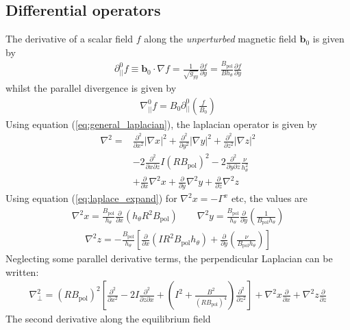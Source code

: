 \documentclass[12pt]{article}
\newcommand{\deriv}[2]{\ensuremath{\frac{\partial #1}{\partial #2}}}
\newcommand{\dderiv}[2]{\ensuremath{\frac{\partial^2 #1}{\partial {#2}^2}}}
\newcommand{\hthe}{\ensuremath{h_\theta}}
\newcommand{\Bp}{\ensuremath{B_{\text{pol}}}}
\newcommand{\ve}[1]{\ensuremath{\boldsymbol{#1}}}
\newcommand{\delp}{\nabla_\perp^2}
\newcommand{\rbp}{\ensuremath{R\Bp}}
\newcommand{\rbpsq}{\ensuremath{\left(\rbp\right)^2}}
\begin{document}
\subsection{Differential operators}
%
The derivative of a scalar field $f$ along the \emph{unperturbed} magnetic
field $\ve{b}_0$ is given by
%
\begin{align*}
\partial^0_{||}f \equiv \ve{b}_0 \cdot\nabla f =
\frac{1}{\sqrt{g_{yy}}}\deriv{f}{y} = \frac{\Bp}{B\hthe}\deriv{f}{y}
\end{align*}
%
whilst the parallel divergence is given by
%
\begin{align*}
\nabla^0_{||}f = B_0\partial^0_{||}\left(\frac{f}{B_0}\right)
\end{align*}
%
Using equation (\ref{eq:general_laplacian}), the laplacian operator is given by
%
\begin{align*}
\nabla^2 = &\frac{\partial^2}{\partial x^2}\left|\nabla x\right|^2 +
    \frac{\partial^2}{\partial y^2}\left|\nabla y\right|^2 +
    \frac{\partial^2}{\partial z^2}\left|\nabla z\right|^2 \nonumber \\
    &-2\frac{\partial^2}{\partial x\partial z}I\left(R\Bp\right)^2 -
    2\frac{\partial^2}{\partial y\partial z}\frac{\nu}{h_\theta^2}\\
    &+\frac{\partial}{\partial x}\nabla^2x + \frac{\partial}{\partial
y}\nabla^2y + \frac{\partial}{\partial z}\nabla^2z \nonumber
\end{align*}
%
Using equation (\ref{eq:laplace_expand}) for $\nabla^2x = -\Gamma^x$ etc, the
values are
%
\begin{align*}
\nabla^2x = \frac{\Bp}{h_\theta}\frac{\partial}{\partial x}\left(h_\theta
R^2\Bp\right) \qquad \nabla^2y = \frac{\Bp}{h_\theta}\frac{\partial}{\partial
y}\left(\frac{1}{\Bp h_\theta}\right)
\end{align*}
%
\begin{align*}
\nabla^2z = -\frac{\Bp}{h_\theta}\left[\frac{\partial}{\partial x}\left(IR^2\Bp
h_\theta\right) + \frac{\partial}{\partial y}\left(\frac{\nu}{\Bp
h_\theta}\right)\right]
\end{align*}
%
Neglecting some parallel derivative terms, the perpendicular Laplacian can be
written:
%
\begin{align*}
\delp = \rbpsq\left[\dderiv{}{x} - 2I\frac{\partial^2}{\partial z\partial x} +
\left(I^2 + \frac{B^2}{\left(\rbp\right)^4}\right)\dderiv{}{z}\right] +
\nabla^2 x \deriv{}{x} + \nabla^2 z\deriv{}{z}
\end{align*}
%
The second derivative along the equilibrium field
\end{document}
